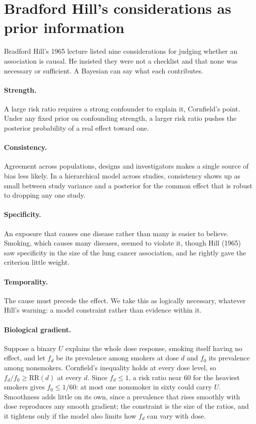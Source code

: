 \section{Bradford Hill's considerations as prior information}

Bradford Hill's 1965 lecture listed nine considerations for judging whether an association is causal. He insisted they were not a checklist and that none was necessary or sufficient. A Bayesian can say what each contributes.

\paragraph{Strength.} A large risk ratio requires a strong confounder to explain it, Cornfield's point. Under any fixed prior on confounding strength, a larger risk ratio pushes the posterior probability of a real effect toward one.

\paragraph{Consistency.} Agreement across populations, designs and investigators makes a single source of bias less likely. In a hierarchical model across studies, consistency shows up as small between study variance and a posterior for the common effect that is robust to dropping any one study.

\paragraph{Specificity.} An exposure that causes one disease rather than many is easier to believe. Smoking, which causes many diseases, seemed to violate it, though Hill (1965) saw specificity in the size of the lung cancer association, and he rightly gave the criterion little weight.

\paragraph{Temporality.} The cause must precede the effect. We take this as logically necessary, whatever Hill's warning: a model constraint rather than evidence within it.

\paragraph{Biological gradient.} Suppose a binary $U$ explains the whole dose response, smoking itself having no effect, and let $f_d$ be its prevalence among smokers at dose $d$ and $f_0$ its prevalence among nonsmokers. Cornfield's inequality holds at every dose level, so $f_d/f_0\geq\mathrm{RR}(d)$ at every $d$. Since $f_d\leq 1$, a risk ratio near 60 for the heaviest smokers gives $f_0\leq 1/60$: at most one nonsmoker in sixty could carry $U$. Smoothness adds little on its own, since a prevalence that rises smoothly with dose reproduces any smooth gradient; the constraint is the size of the ratios, and it tightens only if the model also limits how $f_d$ can vary with dose.

